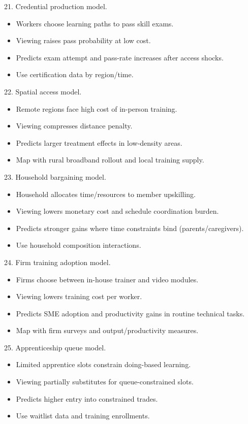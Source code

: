 \documentclass[11pt]{article}
\begin{document}
21. Credential production model.\\
\begin{itemize}
\item Workers choose learning paths to pass skill exams.
\item Viewing raises pass probability at low cost.
\item Predicts exam attempt and pass-rate increases after access shocks.
\item Use certification data by region/time.
\end{itemize}

22. Spatial access model.\\
\begin{itemize}
\item Remote regions face high cost of in-person training.
\item Viewing compresses distance penalty.
\item Predicts larger treatment effects in low-density areas.
\item Map with rural broadband rollout and local training supply.
\end{itemize}

23. Household bargaining model.\\
\begin{itemize}
\item Household allocates time/resources to member upskilling.
\item Viewing lowers monetary cost and schedule coordination burden.
\item Predicts stronger gains where time constraints bind (parents/caregivers).
\item Use household composition interactions.
\end{itemize}

24. Firm training adoption model.\\
\begin{itemize}
\item Firms choose between in-house trainer and video modules.
\item Viewing lowers training cost per worker.
\item Predicts SME adoption and productivity gains in routine technical tasks.
\item Map with firm surveys and output/productivity measures.
\end{itemize}

25. Apprenticeship queue model.\\
\begin{itemize}
\item Limited apprentice slots constrain doing-based learning.
\item Viewing partially substitutes for queue-constrained slots.
\item Predicts higher entry into constrained trades.
\item Use waitlist data and training enrollments.
\end{itemize}
\end{document}
